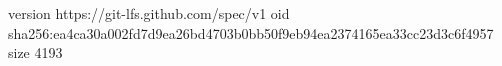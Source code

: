 version https://git-lfs.github.com/spec/v1
oid sha256:ea4ca30a002fd7d9ea26bd4703b0bb50f9eb94ea2374165ea33cc23d3c6f4957
size 4193
